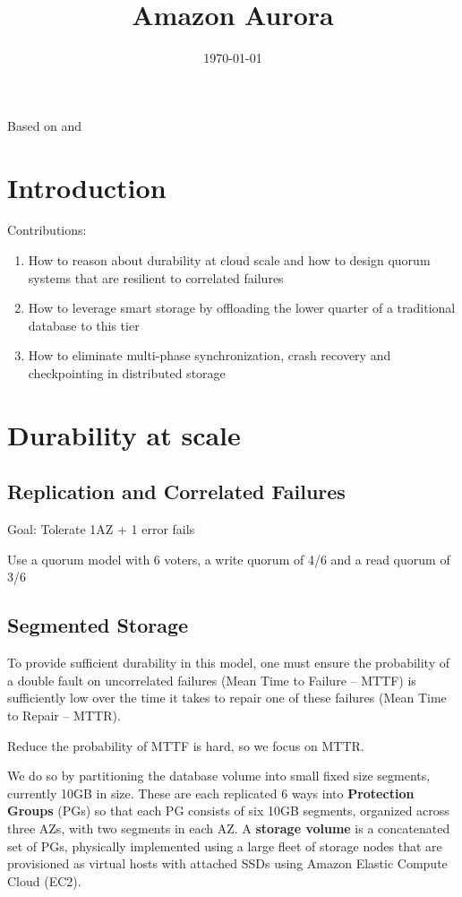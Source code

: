 \documentclass[11pt]{article}
\date{\today}
\title{Amazon Aurora}
\begin{document}
\maketitle
Based on \cite{verbitski2017amazon} and \cite{verbitski2018amazon}
\section{Introduction}
\label{sec:org762e72a}
Contributions:
\begin{enumerate}
\item How to reason about durability at cloud scale and how to design quorum systems that are resilient
to correlated failures
\item How to leverage smart storage by offloading the lower quarter of a traditional database to this tier
\item How to eliminate multi-phase synchronization, crash recovery and checkpointing in distributed
storage
\end{enumerate}
\section{Durability at scale}
\label{sec:org6c50ec9}
\subsection{Replication and Correlated Failures}
\label{sec:org7a3f280}
Goal: Tolerate 1AZ + 1 error fails

Use a quorum model with 6 voters, a write quorum of 4/6 and a read quorum of 3/6
\subsection{Segmented Storage}
\label{sec:orgbb53816}
To provide sufficient durability in this model, one must ensure the probability of a double fault on
uncorrelated failures (Mean Time to Failure – MTTF) is sufficiently low over the time it takes to
repair one of these failures (Mean Time to Repair – MTTR).

Reduce the probability of MTTF is hard, so we focus on MTTR.

We do so by partitioning the database volume into small fixed size segments, currently 10GB in size.
These are each replicated 6 ways into \textbf{Protection Groups} (PGs) so that each PG consists of six 10GB
segments, organized across three AZs, with two segments in each AZ. A \textbf{storage volume} is a concatenated
set of PGs, physically implemented using a large fleet of storage nodes that are provisioned as
virtual hosts with attached SSDs using Amazon Elastic Compute Cloud (EC2).
\end{document}
